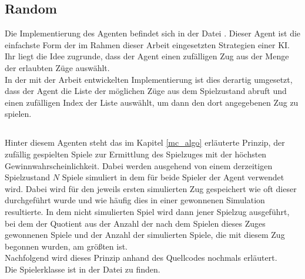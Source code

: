 \subsection{Random}
Die Implementierung des Agenten  befindet sich in der Datei . Dieser Agent ist die einfachste Form der im Rahmen dieser Arbeit eingesetzten Strategien einer \ac{KI}. Ihr liegt die Idee zugrunde, dass der Agent einen zufälligen Zug aus der Menge der erlaubten Züge auswählt.
\\In der mit der Arbeit entwickelten Implementierung ist dies derartig umgesetzt, dass der Agent die Liste der möglichen Züge aus dem Spielzustand abruft und einen zufälligen Index der Liste auswählt, um dann den dort angegebenen Zug zu spielen.

\subsection{\mc}
Hinter diesem Agenten steht das im Kapitel \ref{mc_algo} erläuterte Prinzip, der zufällig gespielten Spiele zur Ermittlung des Spielzuges mit der höchsten Gewinnwahrscheinlichkeit. Dabei werden ausgehend von einem derzeitigen Spielzustand $N$ Spiele simuliert in dem für beide Spieler der Agent  verwendet wird. Dabei wird für den jeweils ersten simulierten Zug gespeichert wie oft dieser durchgeführt wurde und wie häufig dies in einer gewonnenen Simulation resultierte. In dem nicht simulierten Spiel wird dann jener Spielzug ausgeführt, bei dem der Quotient aus der Anzahl der nach dem Spielen dieses Zuges gewonnenen Spiele und der Anzahl der simulierten Spiele, die mit diesem Zug begonnen wurden, am größten ist.
\\Nachfolgend wird dieses Prinzip anhand des Quellcodes nochmals erläutert.
\\Die Spielerklasse  ist in der Datei  zu finden.
